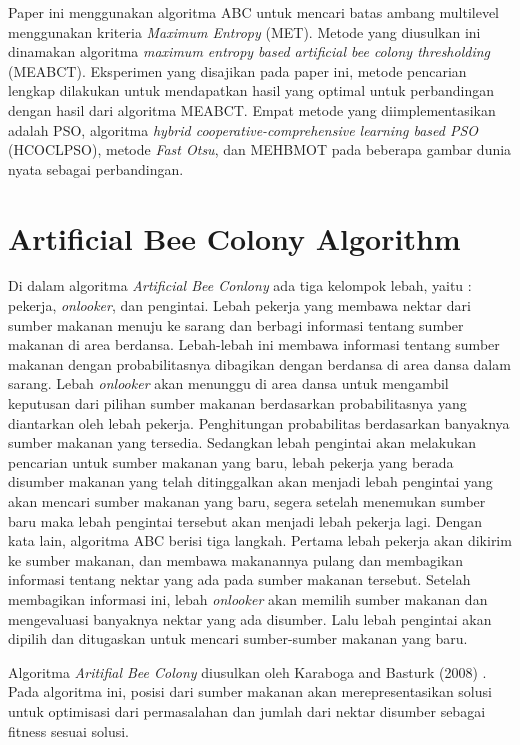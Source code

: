 \documentclass[a4paper, 10pt, conference]{ieeeconf}
\begin{document}
Paper ini menggunakan algoritma ABC untuk mencari batas ambang multilevel menggunakan kriteria \textit{Maximum Entropy} (MET). Metode yang diusulkan ini dinamakan algoritma \textit{maximum entropy based artificial bee colony thresholding }(MEABCT). Eksperimen yang disajikan pada paper ini, metode pencarian lengkap dilakukan untuk mendapatkan hasil yang optimal untuk perbandingan dengan hasil dari algoritma MEABCT. Empat metode yang diimplementasikan adalah PSO, algoritma \textit{hybrid cooperative-comprehensive learning based PSO} (HCOCLPSO), metode \textit{Fast Otsu}, dan MEHBMOT pada beberapa gambar dunia nyata sebagai perbandingan.


\section{Artificial Bee Colony Algorithm}
Di dalam algoritma \textit{Artificial Bee Conlony} ada tiga kelompok lebah, yaitu : pekerja, \textit{onlooker}, dan pengintai. Lebah pekerja yang membawa nektar dari sumber makanan menuju ke sarang dan berbagi informasi tentang sumber makanan di area berdansa. Lebah-lebah ini membawa informasi tentang sumber makanan dengan probabilitasnya dibagikan dengan berdansa di area dansa dalam sarang. Lebah \textit{onlooker} akan menunggu di area dansa untuk mengambil keputusan dari pilihan sumber makanan berdasarkan probabilitasnya yang diantarkan oleh lebah pekerja. Penghitungan probabilitas berdasarkan banyaknya sumber makanan yang tersedia. Sedangkan lebah pengintai akan melakukan pencarian untuk sumber makanan yang baru, lebah pekerja yang berada disumber makanan yang telah ditinggalkan akan menjadi lebah pengintai yang akan mencari sumber makanan yang baru, segera setelah menemukan sumber baru maka lebah pengintai tersebut akan menjadi lebah pekerja lagi. Dengan kata lain, algoritma ABC berisi tiga langkah. Pertama lebah pekerja akan dikirim ke sumber makanan, dan membawa makanannya pulang dan membagikan informasi tentang nektar yang ada pada sumber makanan tersebut. Setelah membagikan informasi ini, lebah \textit{onlooker} akan memilih sumber makanan dan mengevaluasi banyaknya nektar yang ada disumber. Lalu lebah pengintai akan dipilih dan ditugaskan untuk mencari sumber-sumber makanan yang baru.\par

Algoritma \textit{Aritifial Bee Colony} diusulkan oleh Karaboga and Basturk (2008) \cite{c7}. Pada algoritma ini, posisi dari sumber makanan akan merepresentasikan solusi untuk optimisasi dari permasalahan dan jumlah dari nektar disumber sebagai fitness sesuai solusi.
 
\end{document}
